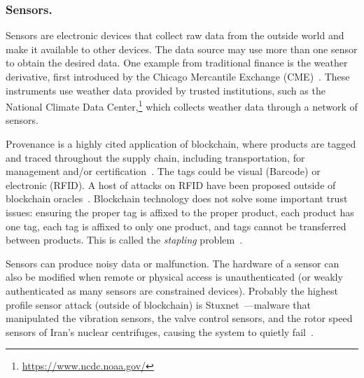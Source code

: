 



\subsubsection{Sensors.} Sensors are electronic devices that collect raw data from the outside world and make it available to other devices. The data source may use more than one sensor to obtain the desired data. One example from traditional finance is the weather derivative, first introduced by the Chicago Mercantile Exchange (CME)~\cite{muller2000weather}. These instruments use weather data provided by trusted institutions, such as the National Climate Data Center,\footnote{\url{https://www.ncdc.noaa.gov/}} which collects weather data through a network of sensors.

Provenance is a highly cited application of blockchain, where products are tagged and traced throughout the supply chain, including transportation, for management and/or certification~\cite{tian2016agri,mondal2019blockchain,zelbst2019impact}. The tags could be visual (Barcode) or electronic (RFID). A host of attacks on RFID have been proposed outside of blockchain oracles~\cite{alizadeh2012survey}. Blockchain technology does not solve some important trust issues: ensuring the proper tag is affixed to the proper product, each product has one tag, each tag is affixed to only one product, and tags cannot be transferred between products. This is called the \textit{stapling} problem~\cite{RKYCC19}. 

Sensors can produce noisy data or malfunction. The hardware of a sensor can also be modified when remote or physical access is unauthenticated (or weakly authenticated as many sensors are constrained devices). Probably the highest profile sensor attack (outside of blockchain) is Stuxnet~\cite{langner2011stuxnet}---malware that manipulated the vibration sensors, the valve control sensors, and the rotor speed sensors of Iran's nuclear centrifuges, causing the system to quietly fail~\cite{stuxnetattack}.


